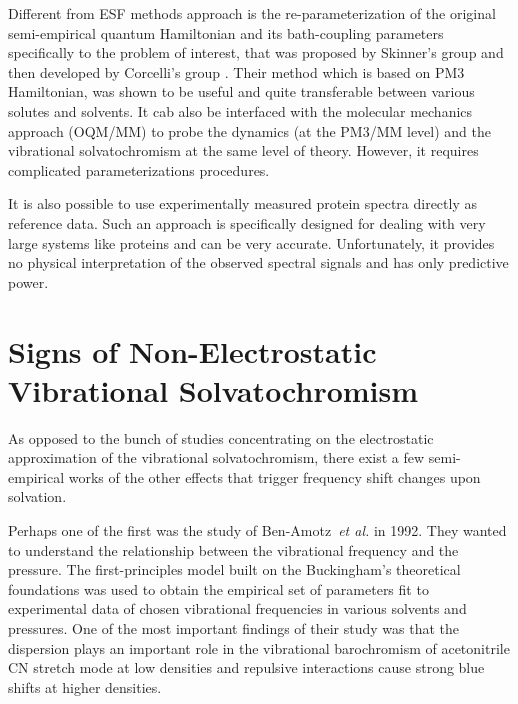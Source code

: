\documentclass[a4paper,titlepage,twoside,fleqn,12pt]{book}
\begin{document}
\begin{refsection}
Different from ESF methods approach is the re\hyp{}parameterization of the original semi\hyp{}empirical 
quantum Hamiltonian and its bath\hyp{}coupling parameters specifically to the problem of interest,
that was proposed by Skinner's group \citep{Li.Schmidt.Corcelli.Lawrence.Skinner.JCP.2006}
and then developed by Corcelli's group \citep{
Lindquist.Corcelli.JPCB.2008,Lindquist.Haws.Corcelli.JPCB.2008,
Lindquist.Furse.Corcelli.PCCP.2009}. Their method which is based on PM3 Hamiltonian, \citep{Stewart.JCC.1988}
was shown to be useful and quite transferable between various solutes and solvents. 
It cab also be interfaced with the molecular mechanics approach (OQM/MM) \citep{Lindquist.Haws.Corcelli.JPCB.2008}
to probe the dynamics (at the PM3/MM level) and the vibrational solvatochromism 
at the same level of theory.
However, it requires complicated
parameterizations procedures.

It is also possible to use experimentally measured protein spectra directly 
as reference data. \citep{Karjalainen.Ersmark.Barth.JPCB.2012}
Such an approach is specifically designed for dealing with very large systems like proteins and
can be very accurate. Unfortunately, it provides no physical interpretation of the observed
spectral signals and has only predictive power.



\section{Signs of Non-Electrostatic Vibrational Solvatochromism\label{s:signs-non-elect-solv}}
As opposed to the bunch of studies concentrating on the electrostatic
approximation of the vibrational solvatochromism, there exist a few 
semi\hyp{}empirical works of the other effects that trigger frequency shift
changes upon solvation. 

Perhaps one of the first was the study of Ben-Amotz~\emph{et al.} in 1992. \citep{Ben-Amotz.Lee.Cho.List.JCP.1992}
They wanted to understand the relationship between the vibrational frequency
and the pressure. The first\hyp{}principles model built on the Buckingham's theoretical
foundations \citep{Buckingham.ProcRSocLondonA.1958,Buckingham.TransFaradaySoc.1960,
Buckingham.ProcRSocLondonA.1960} was used to obtain the empirical set of parameters fit to
experimental data of chosen vibrational frequencies in various solvents
and pressures. One of the most important findings of their study was
that the dispersion plays an important role in the vibrational barochromism
of acetonitrile CN stretch mode at low densities and repulsive interactions cause strong blue shifts
at higher densities.


\end{refsection}
\end{document}

